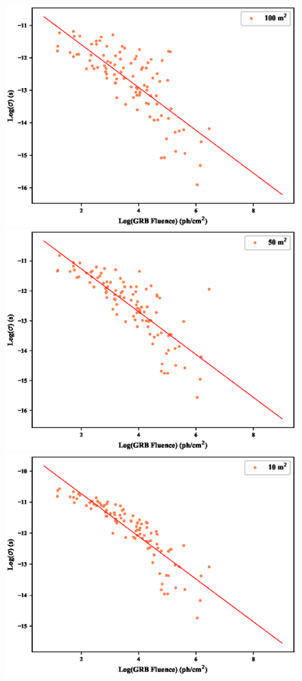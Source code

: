 \documentclass[]{spie}  %
\begin{document}
\begin{figure}[h!]
\centering
\includegraphics[scale=0.5,angle=0]{fig/LONG/sigma_vs_fluence_100.eps}
\includegraphics[scale=0.5,angle=0]{fig/LONG/sigma_vs_fluence_50.eps}\\
\includegraphics[scale=0.5,angle=0]{fig/LONG/sigma_vs_fluence_10.eps}

\end{figure}
\end{document}
